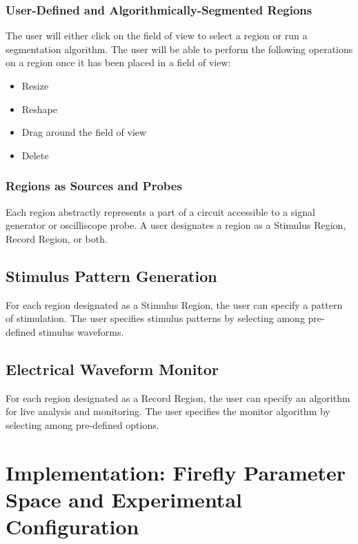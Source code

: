\documentclass[a4paper,12pt]{article}
\begin{document}
\subsubsection{User-Defined and Algorithmically-Segmented Regions}
The user will either click on the field of view to select a region or run a 
segmentation algorithm. The user will be able to perform the following 
operations on a region once it has been placed in a field of view:
\begin{itemize}
  \item Resize
  \item Reshape
  \item Drag around the field of view
  \item Delete
\end{itemize}
\subsubsection{Regions as Sources and Probes}
Each region abstractly represents a part of a circuit accessible to a signal
generator or oscilliscope probe. A user designates a region as a Stimulus Region,
Record Region, or both.
\subsection{Stimulus Pattern Generation}
For each region designated as a Stimulus Region, the user can specify a pattern
of stimulation. The user specifies stimulus patterns by selecting among
pre-defined stimulus waveforms.
\subsection{Electrical Waveform Monitor}
For each region designated as a Record Region, the user can specify an algorithm
for live analysis and monitoring. The user specifies the monitor algorithm by 
selecting among pre-defined options.
\section{Implementation: Firefly Parameter Space and Experimental Configuration}
\end{document}
